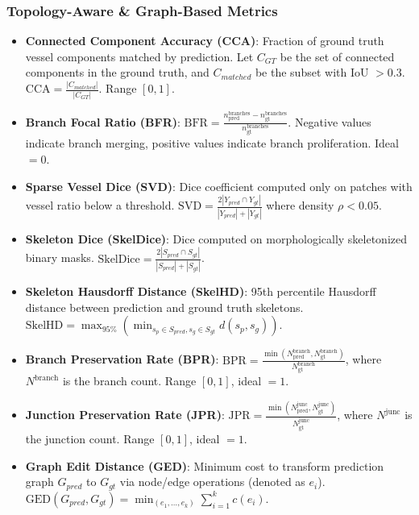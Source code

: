 \documentclass[conference]{IEEEtran}
\begin{document}
\subsubsection{Topology-Aware \& Graph-Based Metrics}
\begin{itemize}
    \item \textbf{Connected Component Accuracy (CCA)}: Fraction of ground truth vessel components matched by prediction. Let $C_{GT}$ be the set of connected components in the ground truth, and $C_{matched}$ be the subset with IoU $>0.3$. $\text{CCA} = \frac{|C_{matched}|}{|C_{GT}|}$. Range $[0,1]$.
    \item \textbf{Branch Focal Ratio (BFR)}: $\text{BFR} = \frac{n_{\text{pred}}^{\text{branches}} - n_{\text{gt}}^{\text{branches}}}{n_{\text{gt}}^{\text{branches}}}$. Negative values indicate branch merging, positive values indicate branch proliferation. Ideal $=0$.
    \item \textbf{Sparse Vessel Dice (SVD)}: Dice coefficient computed only on patches with vessel ratio below a threshold. $\text{SVD} = \frac{2 |Y_{pred} \cap Y_{gt}|}{|Y_{pred}| + |Y_{gt}|}$ where density $\rho < 0.05$.
    \item \textbf{Skeleton Dice (SkelDice)}: Dice computed on morphologically skeletonized binary masks. $\text{SkelDice} = \frac{2 |S_{pred} \cap S_{gt}|}{|S_{pred}| + |S_{gt}|}$.
    \item \textbf{Skeleton Hausdorff Distance (SkelHD)}: 95th percentile Hausdorff distance between prediction and ground truth skeletons. $\text{SkelHD} = \max_{95\%} ( \min_{s_p \in S_{pred}, s_g \in S_{gt}} d(s_p, s_g) )$.
    \item \textbf{Branch Preservation Rate (BPR)}: $\text{BPR} = \frac{\min(N_{\text{pred}}^{\text{branch}}, N_{\text{gt}}^{\text{branch}})}{N_{\text{gt}}^{\text{branch}}}$, where $N^{\text{branch}}$ is the branch count. Range $[0,1]$, ideal $=1$.
    \item \textbf{Junction Preservation Rate (JPR)}: $\text{JPR} = \frac{\min(N_{\text{pred}}^{\text{junc}}, N_{\text{gt}}^{\text{junc}})}{N_{\text{gt}}^{\text{junc}}}$, where $N^{\text{junc}}$ is the junction count. Range $[0,1]$, ideal $=1$.
    \item \textbf{Graph Edit Distance (GED)}: Minimum cost to transform prediction graph $G_{pred}$ to $G_{gt}$ via node/edge operations (denoted as $e_i$). $\text{GED}(G_{pred}, G_{gt}) = \min_{(e_1,\dots,e_k)} \sum_{i=1}^k c(e_i)$.
\end{itemize}
\end{document}
